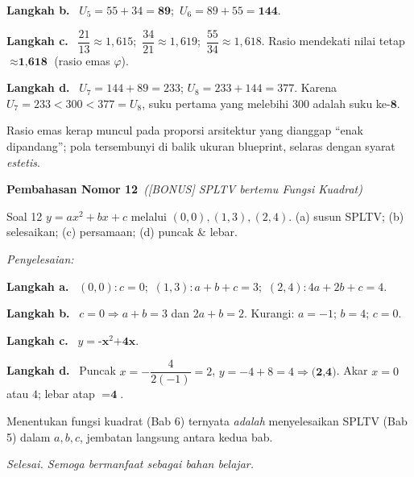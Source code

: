 \documentclass[11pt,a4paper]{article}
\newcommand{\jawab}{\par\smallskip\noindent\textit{\textcolor{oranye}{Penyelesaian:}}\par\smallskip}
\newcommand{\langkah}[1]{\par\smallskip\noindent\textbf{\textcolor{biru}{Langkah #1.}}\ }
\newcommand{\nomorjudul}[2]{\par\bigskip\noindent%
  {\large\bfseries\color{ungu}Pembahasan Nomor #1}\ {\normalfont\itshape\color{gray}(#2)}\par\nopagebreak\smallskip}
\begin{document}
\langkah{b} $U_5=55+34=\textbf{89}$;\ $U_6=89+55=\textbf{144}$.

\langkah{c} $\dfrac{21}{13}\approx1{,}615$;\ $\dfrac{34}{21}\approx1{,}619$;\
$\dfrac{55}{34}\approx1{,}618$. Rasio mendekati nilai tetap
$\approx\textbf{1{,}618}$ (rasio emas $\varphi$).

\langkah{d} $U_7=144+89=233$; $U_8=233+144=377$. Karena $U_7=233<300<377=U_8$,
suku pertama yang melebihi $300$ adalah suku ke-$\textbf{8}$.

\begin{tips}
Rasio emas kerap muncul pada proporsi arsitektur yang dianggap ``enak
dipandang''; pola tersembunyi di balik ukuran blueprint, selaras
dengan syarat \emph{estetis}.
\end{tips}

\nomorjudul{12}{[BONUS] SPLTV bertemu Fungsi Kuadrat}
\begin{soalbox}{Soal 12}
$y=ax^2+bx+c$ melalui $(0,0),(1,3),(2,4)$. (a) susun SPLTV; (b) selesaikan;
(c) persamaan; (d) puncak \& lebar.
\end{soalbox}

\jawab
\langkah{a} $(0,0)\!:c=0$;\ $(1,3)\!:a+b+c=3$;\ $(2,4)\!:4a+2b+c=4$.

\langkah{b} $c=0\Rightarrow a+b=3$ dan $2a+b=2$. Kurangi: $a=-1$; $b=4$; $c=0$.

\langkah{c} $y=\textbf{-x}^2\textbf{+4x}$.

\langkah{d} Puncak $x=-\dfrac{4}{2(-1)}=2$, $y=-4+8=4\Rightarrow\textbf{(2,4)}$.
Akar $x=0$ atau $4$; lebar atap $=\textbf{4}$.

\begin{tips}
Menentukan fungsi kuadrat (Bab 6) ternyata \emph{adalah} menyelesaikan SPLTV
(Bab 5) dalam $a,b,c$, jembatan langsung antara kedua bab.
\end{tips}

\vfill
\begin{center}\small\itshape
Selesai. Semoga bermanfaat sebagai bahan belajar.
\end{center}
\end{document}
